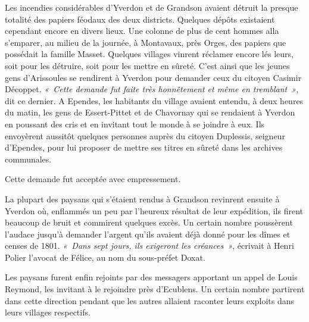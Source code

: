 \documentclass[french,twoside]{book} %
\begin{document}
Les incendies considérables d’Yverdon et de Grandson avaient détruit la presque totalité des papiers féodaux des deux districts. Quelques dépôts existaient cependant encore en divers lieux. Une colonne de plus de cent hommes alla s’emparer, au milieu de la journée, à Montavaux, près Orges, des papiers que possédait la famille Masset. Quelques villages vinrent réclamer encore lés leurs, soit pour les détruire, soit pour les mettre en sûreté. C’est ainsi que les jeunes gens d’Arissoules se rendirent à Yverdon pour demander ceux du citoyen Casimir Décoppet. \emph{« Cette demande fut faite très honnêtement et même en tremblant »}, dit ce dernier. A Ependes, les habitants du village avaient entendu, à deux heures du matin, les gens de Essert-Pittet et de Chavornay qui se rendaient à Yverdon en poussant des cris et en invitant tout le monde à se joindre à eux. Ils envoyèrent aussitôt quelques personnes auprès du citoyen Duplessis, seigneur d’Ependes, pour lui proposer de mettre ses titres en sûreté dans les archives communales.\par
Cette demande fut acceptée avec empressement.\par
La plupart des paysans qui s’étaient rendus à Grandson revinrent ensuite à Yverdon où, enflammés un peu par l’heureux résultat de leur expédition, ils firent beaucoup de bruit et commirent quelques excès. Un certain nombre poussèrent l’audace jusqu’à demander l’argent qu’ils avaient déjà donné pour les dîmes et censes de 1801. \emph{« Dans sept jours, ils exigeront les créances »}, écrivait à Henri Polier l’avocat de Félice, au nom du sous-préfet Doxat.\par
Les paysans furent enfin rejoints par des messagers apportant un appel de Louis Reymond, les invitant à le rejoindre près d’Ecublens. Un certain nombre partirent dans cette direction pendant que les autres allaient raconter leurs exploits dans leurs villages respectifs.
\end{document}
